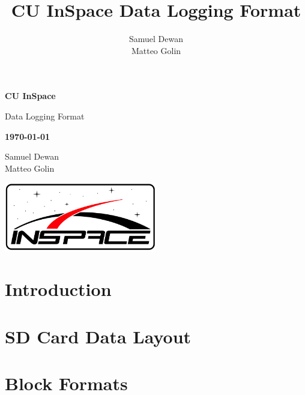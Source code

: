 \documentclass[11pt,letterpaper]{article}
\title{CU InSpace Data Logging Format}
\author{Samuel Dewan \\ Matteo Golin}
\begin{document}
\frenchspacing

\begin{titlepage}
	\centering

	{\large \textbf{CU InSpace}}

	{\Huge \sffamily Data Logging Format}

	{\large \textbf{\today}}

	Samuel Dewan \\
	Matteo Golin

	\includegraphics[width=0.5\textwidth]{logo.png}

\end{titlepage}

\tableofcontents
\clearpage
{}

\section{Introduction}
\label{sec:introduction}

\clearpage

\section{SD Card Data Layout}
\label{sec:sd-data-layout}

\clearpage

\section{Block Formats}
\label{sec:block-formats}

\clearpage
\end{document}
